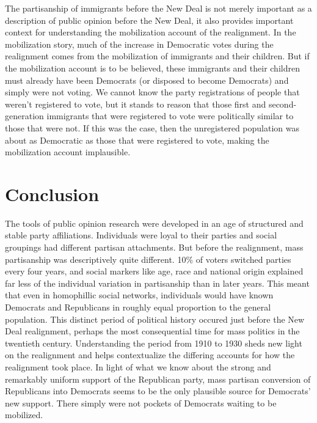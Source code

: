 \documentclass[11pt]{scrartcl}\usepackage[]{graphicx}\usepackage[]{color}
\begin{document}
The partisanship of immigrants before the New Deal is not merely important as a description of public opinion before the New Deal, it also provides important context for understanding the mobilization account of the realignment. In the mobilization story, much of the increase in Democratic votes during the realignment comes from the mobilization of immigrants and their children. But if the mobilization account is to be believed, these immigrants and their children must already have been Democrats (or disposed to become Democrats) and simply were not voting. We cannot know the party registrations of people that weren't registered to vote, but it stands to reason that those first and second-generation immigrants that were registered to vote were politically similar to those that were not.  If this was the case, then the unregistered population was about as Democratic as those that were registered to vote, making the mobilization account implausible.

\section*{Conclusion}

% 

The tools of public opinion research were developed in an age of structured and stable party affiliations. Individuals were loyal to their parties and social groupings had different partisan attachments. But before the realignment, mass partisanship was descriptively quite different. 10\% of voters switched parties every four years, and social markers like age, race and national origin explained far less of the individual variation in partisanship than in later years. This meant that even in homophillic social networks, individuals would have known Democrats and Republicans in roughly equal proportion to the general population. This distinct period of political history occured just before the New Deal realignment, perhaps the most consequential time for mass politics in the twentieth century. Understanding the period from 1910 to 1930 sheds new light on the realignment and helps contextualize the differing accounts for how the realignment took place. In light of what we know about the strong and remarkably uniform support of the Republican party, mass partisan conversion of Republicans into Democrats seems to be the only plausible source for Democrats' new support. There simply were not pockets of Democrats waiting to be mobilized.
\end{document}
